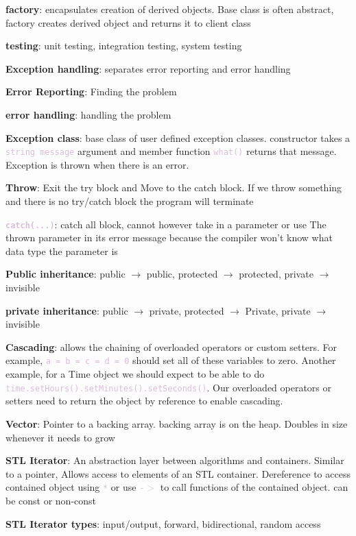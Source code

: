 \documentclass{article}
\newcommand{\code}[1]{\textcolor{Thistle}{\texttt{#1}}}
\newcommand{\definition}[2]{\textbf{#1}: #2}
\begin{document}
{\definition{factory}{encapsulates creation of derived objects. Base class is often abstract, factory creates derived object and returns it to client class}

\definition{testing}{unit testing, integration testing, system testing}

\definition{Exception handling}{separates error reporting and error handling}

\definition{Error Reporting}{Finding the problem}

\definition{error handling}{handling the problem}

\definition{Exception class}{base class of user defined exception classes. constructor takes a \code{string message} argument and member function \code{what()} returns that message. Exception is thrown when there is an error.}

\definition{Throw}{Exit the try block and Move to the catch block. If we throw something and there is no try/catch block the program will terminate} 

\definition{\code{catch(...)}}{catch all block, cannot however take in a parameter or use The thrown parameter in its error message because the compiler won't know what data type the parameter is}

\definition{Public inheritance}{public $\rightarrow$ public, protected $\rightarrow$ protected, private $\rightarrow$ invisible}

\definition{private inheritance}{public $\rightarrow$ private, protected $\rightarrow$ Private, private  $\rightarrow$ invisible}

\definition{Cascading}{allows the chaining of overloaded operators or custom setters. For example, \code{a = b = c = d = 0} should set all of these variables to zero. Another example, for a Time object we should expect to be able to do \code{time.setHours().setMinutes().setSeconds()}. Our overloaded operators or setters need to return the object by reference to enable cascading. }

\definition{Vector}{Pointer to a backing array. backing array is on the heap. Doubles in size whenever it needs to grow}

\definition{STL Iterator}{An abstraction layer between algorithms and containers. Similar to a pointer, Allows access to elements of an STL container. Dereference to access contained object using \code{*} or use \code{-$>$} to call functions of the contained object. can be const or non-const}

\definition{STL Iterator types}{input/output, forward, bidirectional, random access}

}
\end{document}
